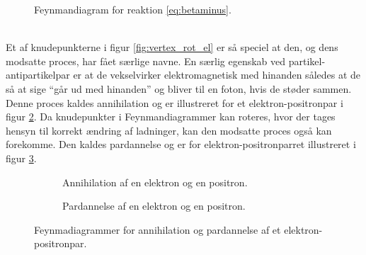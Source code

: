 %
\begin{figure}
    \centering
    \caption{Feynmandiagram for reaktion \ref{eq:betaminus}.}
    \label{fig:betaminus}
\end{figure}
%
\\

Et af knudepunkterne i figur \ref{fig:vertex_rot_el} er så speciel at den, og dens modsatte proces, har fået særlige navne. En særlig egenskab ved partikel-antipartikelpar er at de vekselvirker elektromagnetisk med hinanden således at de så at sige ``går ud med hinanden'' og bliver til en foton, hvis de støder sammen. Denne proces kaldes annihilation og er illustreret for et elektron-positronpar i figur \ref{fig:annihilation}. Da knudepunkter i Feynmandiagrammer kan roteres, hvor der tages hensyn til korrekt ændring af ladninger, kan den modsatte proces også kan forekomme. Den kaldes pardannelse og er for elektron-positronparret illustreret i figur \ref{fig:pardannelse}.
%
\begin{figure}
    \centering
    \begin{subfigure}{.47\textwidth}
        \centering
        \caption{Annihilation af en elektron og en positron.}
        \label{fig:annihilation}
    \end{subfigure}
    \hspace{5mm}
    \begin{subfigure}{.47\textwidth}
        \centering
        \caption{Pardannelse af en elektron og en positron.}
        \label{fig:pardannelse}
    \end{subfigure}
    \caption{Feynmadiagrammer for annihilation og pardannelse af et elektron-positronpar.}
    \label{fig:annihilation_pardannelse}
\end{figure}

